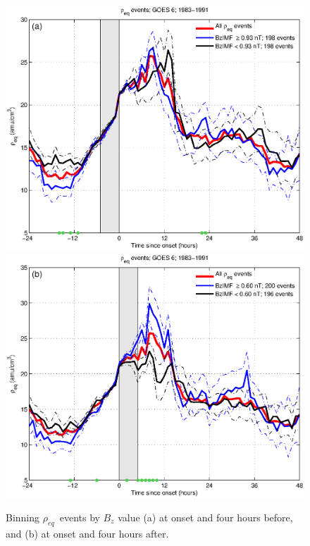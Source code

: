 \documentclass[10pt,twocolumn]{article}
\newcommand{\req}{\ensuremath{\rho_{eq}}}
\begin{document}
\begin{figure}[tp!]
	\centering
	\includegraphics[scale=0.40]{figures/RhoBinned/RhoBinnedBzIMF-case24-t020-tf25-GOES6.eps}
	\includegraphics[scale=0.40]{figures/RhoBinned/RhoBinnedBzIMF-case24-t025-tf30-GOES6.eps}
	\caption{Binning \req\ events by $B_z$ value (a) at onset and four hours before, and (b) at onset and four hours after.}
	\label{fig:RhoBinned}
\end{figure}
\end{document}

